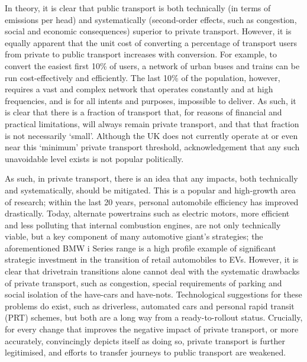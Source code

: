 \documentclass[conference]{IEEEtran}
\begin{document}
In theory, it is clear that public transport is both technically (in
terms of emissions per head) and systematically (second-order effects,
such as congestion, social and economic consequences) superior to
private transport. However, it is equally apparent that the unit cost
of converting a percentage of transport users from private to public
transport increases with conversion. For example, to convert the
easiest first 10\% of users, a network of urban buses and trains can
be run cost-effectively and efficiently. The last 10\% of the
population, however, requires a vast and complex network that operates
constantly and at high frequencies, and is for all intents and
purposes, impossible to deliver. As such, it is clear that there is a
fraction of transport that, for reasons of financial and practical
limitations, will always remain private transport, and that that
fraction is not necessarily `small'. Although the UK does not
currently operate at or even near this `minimum' private transport
threshold, acknowledgement that any such unavoidable level exists is
not popular politically.

As such, in private transport, there is an idea that any impacts, both
technically and systematically, should be mitigated. This is a popular
and high-growth area of research; within the last 20 years, personal
automobile efficiency has improved drastically. Today, alternate
powertrains such as electric motors, more efficient and less polluting
that internal combustion engines, are not only technically viable, but
a key component of many automotive giant’s strategies; the
aforementioned BMW i Series range is a high profile example of
significant strategic investment in the transition of retail
automobiles to EVs. However, it is clear that drivetrain transitions
alone cannot deal with the systematic drawbacks of private transport,
such as congestion, special requirements of parking and social
isolation of the have-cars and have-nots. Technological suggestions
for these problems do exist, such as driverless, automated cars and
personal rapid transit (PRT) schemes, but both are a long way from a
ready-to-rollout status. Crucially, for every change that improves the
negative impact of private transport, or more accurately, convincingly
depicts itself as doing so, private transport is further legitimised,
and efforts to transfer journeys to public transport are weakened.
\end{document}
